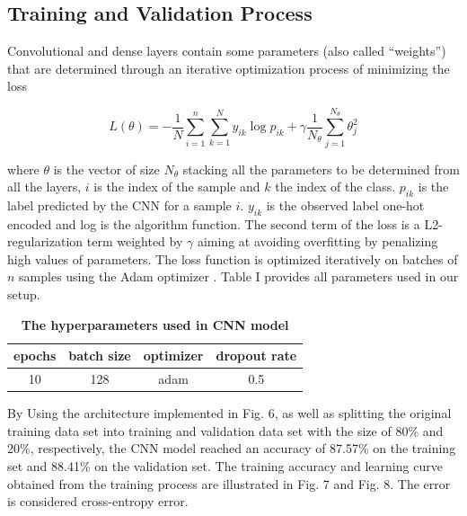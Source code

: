 \documentclass[conference]{IEEEtran}
\begin{document}
\subsection{Training and Validation Process}

Convolutional and dense layers contain some parameters (also called “weights”) that are determined through an iterative optimization process of minimizing the loss 

\[ L(\theta) = -\frac{1}{N}\sum_{i=1}^{n}\sum_{k=1}^{N}y_{ik}\log{p_{ik}} + \gamma\frac{1}{N_\theta}\sum_{j=1}^{N_\theta}\theta_j^2\]

where \( \theta \) is the vector of size \(N_\theta \) stacking all the parameters to be determined from all the layers, \(i\) is the index of the sample and \(k\) the index of the class. \(p_{ik}\) is the label predicted by the CNN for a sample \(i\). \(y_{ik}\) is the observed label one-hot encoded and log is the algorithm function. The second term of the loss is a L2-regularization term weighted by \(\gamma\) aiming at avoiding overfitting by penalizing high values of parameters. The loss function is optimized iteratively on batches of \(n\) samples using the Adam optimizer \cite{b5}. Table I provides all parameters used in our setup. 

\begin{table}[h!]
\begin{center}
\begin{tabular}{||c c c c||} 
 \hline
 epochs & batch size & optimizer & dropout rate\\ [0.5ex] 
 \hline\hline
 10 & 128 & adam & 0.5 \\ 
 \hline
\end{tabular}
\caption{\label{t1} \textbf{The hyperparameters used in CNN model} }
\end{center}
\end{table}

By Using the architecture implemented in Fig. 6, as well as splitting the original training data set into training and validation data set with the size of 80\% and 20\%, respectively, the CNN model reached an accuracy of 87.57\% on the training set and 88.41\% on the validation set. The training accuracy and learning curve obtained from the training process are illustrated in Fig. 7 and Fig. 8. The error is considered cross-entropy error. 
\end{document}

